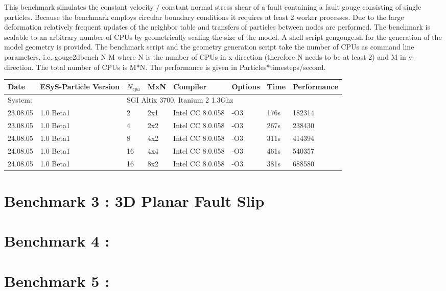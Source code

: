 \documentclass{manual}
\begin{document}
This benchmark simulates the constant velocity / constant normal stress shear of a fault containing a fault gouge consisting of single particles. Because the benchmark employs circular boundary conditions it requires at least 2 worker processes. Due to the large deformation relatively frequent updates of the neighbor table and transfers of particles between nodes are performed. The benchmark is scalable to an arbitrary number of CPUs by geometrically scaling the size of the model. A shell script {\sf gengouge.sh} for the generation of the model geometry is provided.  The benchmark script and the geometry generation script take the number of CPUs as command line parameters, i.e. {\sf gouge2dbench N M} where N is the number of CPUs in x-direction (therefore N needs to be at least 2) and M in y-direction. The total number of CPUs is M*N. The performance is given in Particles*timesteps/second. 

\begin{tabular}[h]{|l|l|l|l|l|l||l|l|}
\hline
Date & ESyS-Particle Version & $N_{cpu}$ & MxN & Compiler & Options & Time  & Performance \\
\hline
\hline
\multicolumn{2}{|l}{System: } & \multicolumn{6}{l|}{SGI Altix 3700, Itanium 2 1.3Ghz } \\
\hline
23.08.05 & 1.0 Beta1 & 2 & 2x1 & Intel CC 8.0.058 & -O3 & 176s & 182314 \\
\hline
23.08.05 & 1.0 Beta1 & 4 & 2x2  & Intel CC 8.0.058 & -O3 & 267s & 238430 \\
\hline
24.08.05 & 1.0 Beta1 & 8 & 4x2  & Intel CC 8.0.058 & -O3 & 311s & 414394 \\
\hline
24.08.05 & 1.0 Beta1 & 16 & 4x4  & Intel CC 8.0.058 & -O3 & 461s & 540357 \\
\hline
24.08.05 & 1.0 Beta1 & 16 & 8x2  & Intel CC 8.0.058 & -O3 & 381s & 688580 \\
\hline
\end{tabular}  

\section{Benchmark 3 : 3D Planar Fault Slip}

\section{Benchmark 4 : }

\section{Benchmark 5 : }
\end{document}
